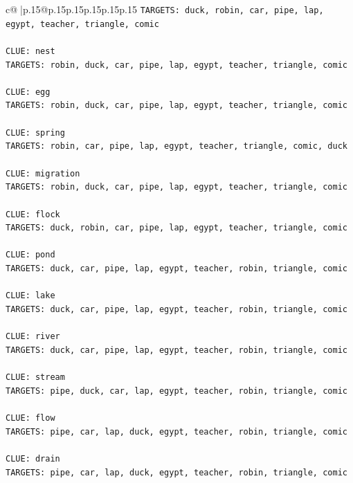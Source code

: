 \documentclass{article}
\begin{document}
{\begin{supertabular}{c@{$\;$}|p{.15\linewidth}@{}p{.15\linewidth}p{.15\linewidth}p{.15\linewidth}p{.15\linewidth}p{.15\linewidth}}
{{{\texttt{TARGETS: duck, robin, car, pipe, lap, egypt, teacher, triangle, comic} \\
\\ 
\texttt{CLUE: nest} \\
\texttt{TARGETS: robin, duck, car, pipe, lap, egypt, teacher, triangle, comic} \\
\\ 
\texttt{CLUE: egg} \\
\texttt{TARGETS: robin, duck, car, pipe, lap, egypt, teacher, triangle, comic} \\
\\ 
\texttt{CLUE: spring} \\
\texttt{TARGETS: robin, car, pipe, lap, egypt, teacher, triangle, comic, duck} \\
\\ 
\texttt{CLUE: migration} \\
\texttt{TARGETS: robin, duck, car, pipe, lap, egypt, teacher, triangle, comic} \\
\\ 
\texttt{CLUE: flock} \\
\texttt{TARGETS: duck, robin, car, pipe, lap, egypt, teacher, triangle, comic} \\
\\ 
\texttt{CLUE: pond} \\
\texttt{TARGETS: duck, car, pipe, lap, egypt, teacher, robin, triangle, comic} \\
\\ 
\texttt{CLUE: lake} \\
\texttt{TARGETS: duck, car, pipe, lap, egypt, teacher, robin, triangle, comic} \\
\\ 
\texttt{CLUE: river} \\
\texttt{TARGETS: duck, car, pipe, lap, egypt, teacher, robin, triangle, comic} \\
\\ 
\texttt{CLUE: stream} \\
\texttt{TARGETS: pipe, duck, car, lap, egypt, teacher, robin, triangle, comic} \\
\\ 
\texttt{CLUE: flow} \\
\texttt{TARGETS: pipe, car, lap, duck, egypt, teacher, robin, triangle, comic} \\
\\ 
\texttt{CLUE: drain} \\
\texttt{TARGETS: pipe, car, lap, duck, egypt, teacher, robin, triangle, comic} \\
}}}
\end{supertabular}}
\end{document}
